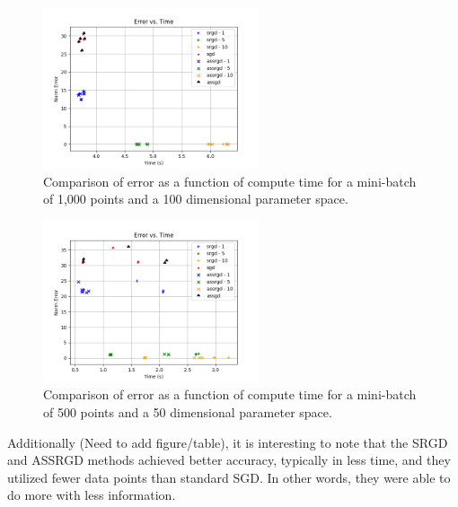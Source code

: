 \documentclass[conference,compsoc]{IEEEtran}
\begin{document}
\begin{figure}[!t]
    \centering
    \includegraphics[width=2.5in]{dim-100-batch-1000}
    \caption{Comparison of error as a function of compute time for a mini-batch
    of 1,000 points and a 100 dimensional parameter space.}
    \label{fig:dim10}
\end{figure}
\begin{figure}[!t]
    \centering
    \includegraphics[width=2.5in]{dim-50-batch-500}
    \caption{Comparison of error as a function of compute time for a mini-batch
        of 500 points and a 50 dimensional parameter space.}
    \label{fig:dim50}
\end{figure}

Additionally (Need to add figure/table), it is interesting to note that the
SRGD and ASSRGD methods achieved better accuracy, typically in less time, and
they utilized fewer data points than standard SGD. In other words, they were
able to do more with less information.

%
%
\end{document}
